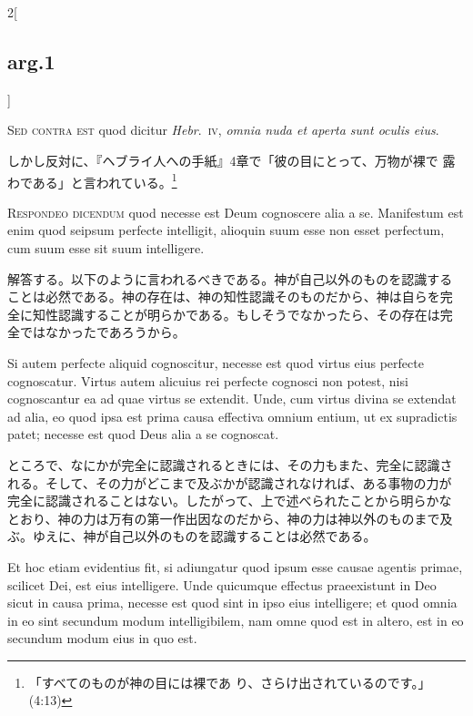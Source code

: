 \documentclass[paper=a4paper,fontsize=10pt,jafontsize=9pt,titlepage]{jlreq}
\begin{document}
\begin{paracol}{2}[\subsection{arg.1}]
\switchcolumn*[\subsection{s.c.}]

{\scshape Sed contra est} quod dicitur {\itshape Hebr}.~{\scshape iv},
{\itshape omnia nuda et aperta sunt oculis eius}.

\switchcolumn

しかし反対に、『ヘブライ人への手紙』4章で「彼の目にとって、万物が裸で
露わである」と言われている。\footnote{「すべてのものが神の目には裸であ
り、さらけ出されているのです。」(4:13)}


{\scshape Respondeo dicendum} quod necesse est Deum cognoscere alia a
se. Manifestum est enim quod seipsum perfecte intelligit, alioquin
suum esse non esset perfectum, cum suum esse sit suum intelligere.

\switchcolumn

解答する。以下のように言われるべきである。神が自己以外のものを認識する
ことは必然である。神の存在は、神の知性認識そのものだから、神は自らを完
全に知性認識することが明らかである。もしそうでなかったら、その存在は完
全ではなかったであろうから。

\switchcolumn*

Si autem perfecte aliquid cognoscitur, necesse est quod virtus eius
perfecte cognoscatur.  Virtus autem alicuius rei perfecte cognosci non
potest, nisi cognoscantur ea ad quae virtus se extendit. Unde, cum
virtus divina se extendat ad alia, eo quod ipsa est prima causa
effectiva omnium entium, ut ex supradictis patet; necesse est quod
Deus alia a se cognoscat.

\switchcolumn

ところで、なにかが完全に認識されるときには、その力もまた、完全に認識さ
れる。そして、その力がどこまで及ぶかが認識されなければ、ある事物の力が
完全に認識されることはない。したがって、上で述べられたことから明らかな
とおり、神の力は万有の第一作出因なのだから、神の力は神以外のものまで及
ぶ。ゆえに、神が自己以外のものを認識することは必然である。

\switchcolumn*

Et hoc etiam evidentius fit, si adiungatur quod ipsum esse causae
agentis primae, scilicet Dei, est eius intelligere. Unde quicumque
effectus praeexistunt in Deo sicut in causa prima, necesse est quod
sint in ipso eius intelligere; et quod omnia in eo sint secundum modum
intelligibilem, nam omne quod est in altero, est in eo secundum modum
eius in quo est.


\end{paracol}
\end{document}
